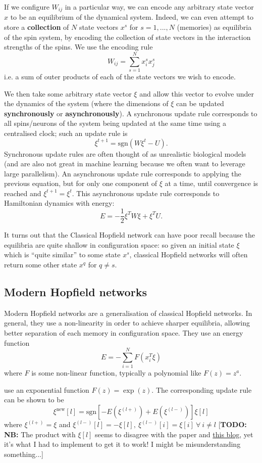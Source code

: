 \documentclass[11pt]{article}
\numberwithin{equation}{section}
\begin{document}
If we configure $W_{ij}$ in a particular way, we can encode any arbitrary state vector $x$ to be an equilibrium of the dynamical system. Indeed, we can even attempt to store a \textbf{collection} of $N$ state vectors $x^s$ for $s=1,...,N$ (memories) as equilibria of the spin system, by encoding the collection of state vectors in the interaction strengths of the spins. We use the encoding rule
$$W_{ij} = \sum_{s=1}^N x_i^s x_j^s$$
i.e. a sum of outer products of each of the state vectors we wish to encode.

We then take some arbitrary state vector $\xi$ and allow this vector to evolve under the dynamics of the system (where the dimensions of $\xi$ can be updated \textbf{synchronously} or \textbf{asynchronously}). A synchronous update rule corresponds to all  spins/neurons of the system being updated at the same time using a centralised clock; such an update rule is
$$\xi^{t+1} = \text{sgn}(W \xi^t - U).$$
Synchronous update rules are often thought of as unrealistic biological models (and are also not great in machine learning because we often want to leverage large parallelism). An asynchronous update rule corresponds to applying the previous equation, but for only one component of $\xi$ at a time, until convergence is reached and $\xi^{t+1} = \xi^t$. This asynchronous update rule corresponds to Hamiltonian dynamics with energy:
$$E=-\frac{1}{2} \xi^T W \xi + \xi^T U.$$

It turns out that the Classical Hopfield network can have poor recall because the equilibria are quite shallow in configuration space: so given an initial state $\xi$ which is ``quite similar'' to some state $x^s$, classical Hopfield networks will often return some other state $x^q$ for $q \neq s$. 

\subsection{Modern Hopfield networks}
Modern Hopfield networks \citep{Krotov16} are a generalisation of classical Hopfield networks. In general, they use a non-linearity in order to achieve sharper equilibria, allowing better separation of each memory in configuration space. They use an energy function
\begin{equation}
E = - \sum_{i=1}^N F(x_i^T \xi)
\end{equation} 
where $F$ is some non-linear function, typically a polynomial like $F(z) = z^a$. 

\cite{Demircigil17} use an exponential function $F(z) = \exp(z)$. The corresponding update rule can be shown to be
\begin{equation}
\xi^{\text{new}}[l] = \text{sgn}\left[ -E(\xi^{(l+)}) + E(\xi^{(l-)}) \right] \xi[l]
\end{equation}
where $\xi^{(l+)} = \xi$ and $\xi^{(l-)}[l] = - \xi[l],\ \xi^{(l-)}[i] = \xi[i]\ \forall\ i \neq l$ [\textbf{TODO: NB:} The product with $\xi[l]$ seems to disagree with the paper and  \href{https://ml-jku.github.io/hopfield-layers/}{this blog}, yet it's what I had to implement to get it to work! I might be misunderstanding something...]
\end{document}
